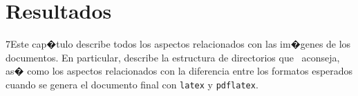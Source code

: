 %
%
%
%
%
%
%
%
%
%

\chapter{Resultados}
\label{cap5}
\label{cap:resultados}


\begin{FraseCelebre}
\begin{Frase}
\end{Frase}
\begin{Fuente}
\end{Fuente}
\end{FraseCelebre}

\begin{resumen}
7Este cap�tulo describe todos los aspectos relacionados con las
im�genes de los documentos. En particular, describe la estructura de
directorios que \texis\ aconseja, as� como los aspectos
relacionados con la diferencia entre los formatos esperados cuando
se genera el documento final con \texttt{latex} y \texttt{pdflatex}.
\end{resumen}

